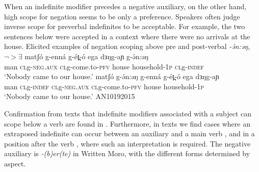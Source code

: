 When an indefinite modifier precedes a negative auxiliary, on the other hand, high scope for negation seems to be only a preference. Speakers often judge inverse scope for preverbal indefinites to be acceptable. For example, the two sentences below were accepted in a context where there were no arrivals at the house.
\ea Elicited examples of negation scoping above pre and post-verbal \textit{-ə́n:əŋ}, $\neg>\exists$ %
	\ea \gll matʃó g-enná g-ét̪-ó ega dɜŋg-aɲ g-ə́n:əŋ\\
			man \textsc{cl}g-\textsc{neg.aux} \textsc{cl}g-come.to-\textsc{pfv} house household-\textsc{1p} \textsc{cl}g-\textsc{indef}\\ 
			\glt ‘Nobody came to our house.’
	\ex \gll matʃó g-ə́n:əŋ g-enná g-ét̪-ó ega dɜŋg-aɲ\\
			man \textsc{cl}g-\textsc{indef} \textsc{cl}g-\textsc{neg.aux} \textsc{cl}g-come.to-\textsc{pfv} house household-\textsc{1p} \\
	\glt ‘Nobody came to our house.’ \hfill AN10192015
	\z
\z

Confirmation from texts that indefinite modifiers associated with a subject can scope below a verb are found in . Furthermore, in texts we find cases where an extraposed indefinite can occur between an auxiliary and a main verb , and in a position after the verb , where such an interpretation is required.  The negative auxiliary is \textit{-(b)er(te)} in Written Moro, with the different forms determined by aspect. 

